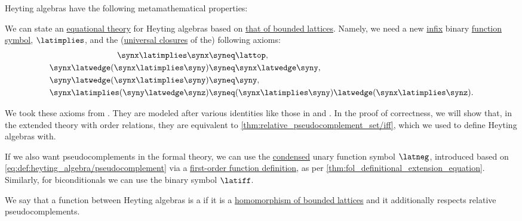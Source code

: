 \begin{definition}
  Heyting algebras have the following metamathematical properties:
  \begin{thmenum}[resume=def:heyting_algebra]
    \mimprovised We can state an \hyperref[def:fol_equational_theory]{equational theory} for Heyting algebras based on \hyperref[def:bounded_lattice/theory]{that of bounded lattices}. Namely, we need a new \hyperref[def:fol_signature/notation]{infix} binary \hyperref[def:fol_signature/function]{function symbol}, \( \latimplies \), and the (\hyperref[def:fol_quantifier_closure]{universal closures} of the) following axioms:
    \begin{align}
      \synx \latimplies \synx                   &\syneq \lattop,                                                       \label{eq:def:heyting_algebra/theory/self} \\
      \synx \latwedge (\synx \latimplies \syny) &\syneq \synx \latwedge \syny,                                         \label{eq:def:heyting_algebra/theory/modus_ponens} \\
      \syny \latwedge (\synx \latimplies \syny) &\syneq \syny,                                                         \label{eq:def:heyting_algebra/theory/modular} \\
      \synx \latimplies (\syny \latwedge \synz) &\syneq (\synx \latimplies \syny) \latwedge (\synx \latimplies \synz). \label{eq:def:heyting_algebra/theory/distributive}
    \end{align}

    We took these axioms from \cite[8]{Johnstone1982StoneSpaces}. They are modeled after various identities like those in  and . In the proof of correctness, we will show that, in the extended theory with order relations, they are equivalent to \cref{thm:relative_pseudocomplement_set/iff}, which we used to define Heyting algebras with.

    If we also want pseudocomplements in the formal theory, we can use the \hyperref[def:fol_signature/notation]{condensed} unary function symbol \( {\latneg} \), introduced based on \eqref{eq:def:heyting_algebra/pseudocomplement} via a \hyperref[def:fol_definition/function]{first-order function definition}, as per \cref{thm:fol_definitional_extension_equation}. Similarly, for biconditionals we can use the binary symbol \( {\latiff} \).

    \mimprovised We say that a function between Heyting algebras is a  if it is a \hyperref[def:bounded_lattice]{homomorphism of bounded lattices} and it additionally respects relative pseudocomplements.


\end{thmenum}
\end{definition}
